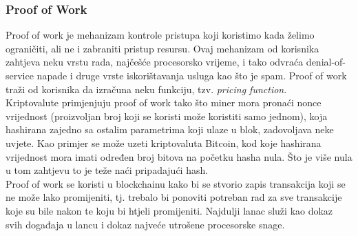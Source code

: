 \documentclass[12pt]{article}
\begin{document}
\subsubsection{Proof of Work}
Proof of work je mehanizam kontrole pristupa koji koristimo kada želimo ograničiti, ali ne i zabraniti pristup resursu. Ovaj mehanizam od korisnika zahtjeva neku vrstu rada, najčešće procesorsko vrijeme, i tako odvraća denial-of-service napade i druge vrste iskorištavanja usluga kao što je spam. Proof of work traži od korisnika da izračuna neku funkciju, tzv. \textit{pricing function}.\\
Kriptovalute primjenjuju proof of work tako što miner mora pronaći nonce vrijednost (proizvoljan broj koji se koristi može koristiti samo jednom), koja hashirana zajedno sa ostalim parametrima koji ulaze u blok, zadovoljava neke uvjete. Kao primjer se može uzeti kriptovaluta Bitcoin, kod koje hashirana vrijednost mora imati određen broj bitova na početku hasha nula. Što je više nula u tom zahtjevu to je teže naći pripadajući hash. \\
Proof of work se koristi u blockchainu kako bi se stvorio zapis transakcija koji se ne može lako promijeniti, tj. trebalo bi ponoviti potreban rad za sve transakcije koje su bile nakon te koju bi htjeli promijeniti. Najdulji lanac služi kao dokaz svih događaja u lancu i dokaz najveće utrošene procesorske snage.\cite{proof-of-work}


\end{document}

